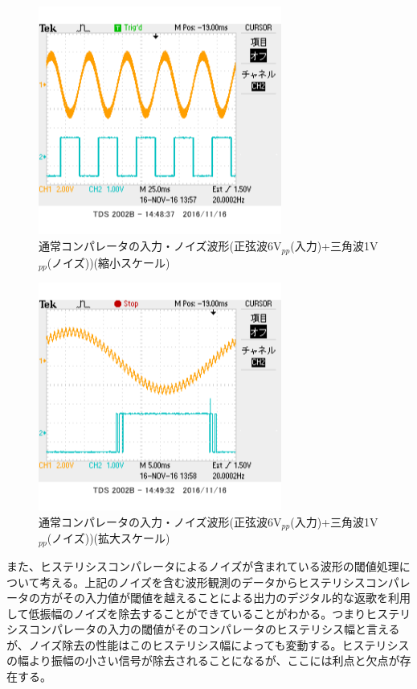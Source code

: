 \documentclass[11pt,a4j]{jsarticle}
\begin{document}
 \begin{figure}[htbp]
  \centering
  \includegraphics[width=8cm,clip]{1_2_noise_after_6-1_BigScale.png}
  \caption{通常コンパレータの入力・ノイズ波形(正弦波6V$_{pp}$(入力)+三角波1V$_{pp}$(ノイズ))(縮小スケール)}
  \label{fig:noise_after_6-1_big}
 \end{figure}
 
 \begin{figure}[htbp]
  \centering
  \includegraphics[width=8cm,clip]{1_2_noise_after_6-1_SmallScale.png}
  \caption{通常コンパレータの入力・ノイズ波形(正弦波6V$_{pp}$(入力)+三角波1V$_{pp}$(ノイズ))(拡大スケール)}
  \label{fig:noise_after_6-1_small}
 \end{figure}
    
    
    
    また、ヒステリシスコンパレータによるノイズが含まれている波形の閾値処理について考える。上記のノイズを含む波形観測のデータからヒステリシスコンパレータの方がその入力値が閾値を越えることによる出力のデジタル的な返歌を利用して低振幅のノイズを除去することができていることがわかる。つまりヒステリシスコンパレータの入力の閾値がそのコンパレータのヒステリシス幅と言えるが、ノイズ除去の性能はこのヒステリシス幅によっても変動する。ヒステリシスの幅より振幅の小さい信号が除去されることになるが、ここには利点と欠点が存在する。
    
\end{document}
